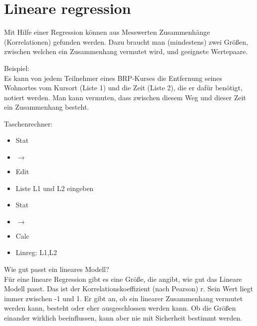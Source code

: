 \newpage
\section{Lineare regression}

Mit Hilfe einer Regression können aus Messwerten Zusammenhänge (Korrelationen) gefunden werden.
Dazu braucht man (mindestens) zwei Größen, zwischen welchen ein Zusammenhang vermutet wird, und geeignete Wertepaare.

\hfill \break
Beispiel:\\
Es kann von jedem Teilnehmer eines BRP-Kurses die Entfernung seines Wohnortes vom Kursort (Liste 1) und die Zeit (Liste 2), die er dafür benötigt, notiert werden.
Man kann vermuten, dass zwischen diesem Weg und dieser Zeit ein Zusammenhang besteht.

\hfill \break
Taschenrechner:\\
\begin{itemize}
    \item Stat 
    \item $\rightarrow$
    \item Edit
    \item Liste L1 und L2 eingeben 
    \item Stat 
    \item $\rightarrow$
    \item Calc
    \item Linreg: L1,L2
\end{itemize}

\newpage
\hfill \break
Wie gut passt ein lineares Modell?\\
Für eine lineare Regression gibt es eine Größe, die angibt, wie gut das Lineare Modell passt.
Das ist der Korrelationskoeffizient (nach Pearson) r.
Sein Wert liegt immer zwischen -1 und 1. Er gibt an, ob ein linearer Zusammenhang vermutet werden kann, besteht oder eher ausgeschlossen werden kann.
Ob die Größen einander wirklich beeinflussen, kann aber nie mit Sicherheit bestimmt werden.

